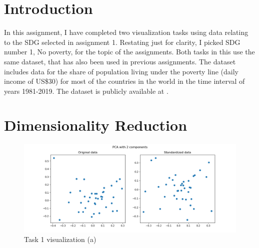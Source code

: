\documentclass[11pt,a4paper,titlepage]{article}
\begin{document}



\section*{Introduction}

In this assignment, I have completed two visualization tasks using data relating to the SDG selected in assignment 1. Restating just for clarity, I picked SDG number 1, No poverty, for the topic of the assignments. Both tasks in this use the same dataset, that has also been used in previous assignments. The dataset includes data for the share of population living under the poverty line (daily income of US\$30) for most of the countries in the world in the time interval of years 1981-2019. The dataset is publicly available at \cite{data}.

\section{Dimensionality Reduction}

\begin{figure}[h]
    \centering
    \includegraphics[width=1.0\linewidth]{reports/assignment-4/imgs/pca.png}
    \caption{Task 1 visualization (a)}
    \label{fig:pca}
\end{figure}
\end{document}
